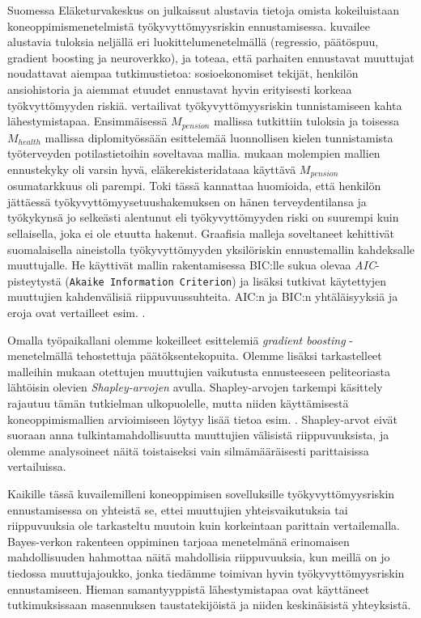  Suomessa Eläketurvakeskus on julkaissut alustavia tietoja omista kokeiluistaan koneoppimismenetelmistä työkyvyttömyysriskin ennustamisessa. \citet{varis_aketurvakeskuksen_2018} kuvailee alustavia tuloksia neljällä eri luokittelumenetelmällä (regressio, päätöspuu, gradient boosting ja neuroverkko), ja toteaa, että parhaiten ennustavat muuttujat noudattavat aiempaa tutkimustietoa: sosioekonomiset tekijät, henkilön ansiohistoria ja aiemmat etuudet ennustavat hyvin erityisesti korkeaa työkvyttömyyden riskiä.  \citet{saarela_work_2022} vertailivat työkyvyttömyysriskin tunnistamiseen kahta lähestymistapaa. Ensimmäisessä $M_{pension}$ mallissa tutkittiin \citet{varis_aketurvakeskuksen_2018} tuloksia ja toisessa $M_{health}$ mallissa \citet{huhta-koivisto_work_2020} diplomityössään esittelemää luonnollisen kielen tunnistamista työterveyden potilastietoihin soveltavaa mallia. \citet{varis_aketurvakeskuksen_2018} mukaan molempien mallien ennustekyky oli varsin hyvä, eläkerekisteridataaa käyttävä $M_{pension}$ osumatarkkuus oli parempi. Toki tässä kannattaa huomioida, että henkilön jättäessä työkyvyttömyysetuushakemuksen on hänen terveydentilansa ja työkykynsä jo selkeästi alentunut eli työkyvyttömyyden riski on suurempi kuin sellaisella, joka ei ole etuutta hakenut. Graafisia malleja soveltaneet \citet{airaksinen_development_2017} kehittivät suomalaisella aineistolla työkyvyttömyyden yksilöriskin ennustemallin kahdeksalle muuttujalle. He käyttivät mallin rakentamisessa BIC:lle sukua olevaa \emph{AIC}-pisteytystä (\texttt{Akaike Information Criterion}) ja lisäksi tutkivat käytettyjen muuttujien kahdenvälisiä riippuvuussuhteita. AIC:n ja BIC:n yhtäläisyyksiä ja eroja ovat vertailleet esim. \citet{ding_model_2018}.

Omalla työpaikallani olemme kokeilleet \citet{friedman_greedy_2001} esittelemiä \emph{gradient boosting} -menetelmällä tehostettuja päätöksentekopuita. Olemme lisäksi tarkastelleet malleihin mukaan otettujen muuttujien vaikutusta ennusteeseen peliteoriasta lähtöisin olevien \emph{Shapley-arvojen} avulla. Shapley-arvojen tarkempi käsittely rajautuu tämän tutkielman ulkopuolelle, mutta niiden käyttämisestä koneoppimismallien arvioimiseen löytyy lisää tietoa esim. \citet{merrick_explanation_2020}. Shapley-arvot eivät suoraan anna tulkintamahdollisuutta muuttujien välisistä riippuvuuksista, ja olemme analysoineet näitä toistaiseksi vain silmämääräisesti parittaisissa vertailuissa.

Kaikille tässä kuvailemilleni koneoppimisen sovelluksille työkyvyttömyysriskin ennustamisessa on yhteistä se, ettei muuttujien yhteisvaikutuksia tai riippuvuuksia ole tarkasteltu muutoin kuin korkeintaan parittain vertailemalla. Bayes-verkon rakenteen oppiminen tarjoaa menetelmänä erinomaisen mahdollisuuden hahmottaa näitä mahdollisia riippuvuuksia, kun meillä on jo tiedossa muuttujajoukko, jonka tiedämme toimivan hyvin työkyvyttömyysriskin ennustamiseen. Hieman samantyyppistä lähestymistapaa ovat käyttäneet \citet{elovainio_is_2021, elovainio_network_2020} tutkimuksissaan masennuksen taustatekijöistä ja niiden keskinäisistä yhteyksistä.

